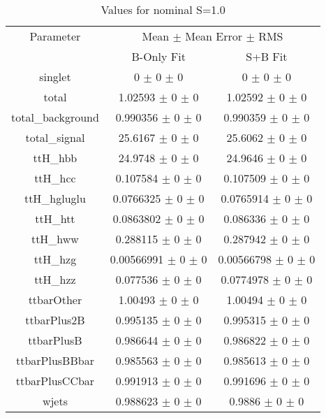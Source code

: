 \begin{table}
\centering
\caption{Values for nominal S=1.0}
\begin{tabular}{ccc}
\toprule
Parameter 	& \multicolumn{2}{c}{Mean $\pm$ Mean Error $\pm$ RMS}\\
 	& B-Only Fit & S+B Fit\\
\midrule
singlet 	& \num{0} $\pm$ \num{0} $\pm$ \num{0} 	& \num{0} $\pm$ \num{0} $\pm$ \num{0}\\
total 	& \num{1.02593} $\pm$ \num{0} $\pm$ \num{0} 	& \num{1.02592} $\pm$ \num{0} $\pm$ \num{0}\\
total\_background 	& \num{0.990356} $\pm$ \num{0} $\pm$ \num{0} 	& \num{0.990359} $\pm$ \num{0} $\pm$ \num{0}\\
total\_signal 	& \num{25.6167} $\pm$ \num{0} $\pm$ \num{0} 	& \num{25.6062} $\pm$ \num{0} $\pm$ \num{0}\\
ttH\_hbb 	& \num{24.9748} $\pm$ \num{0} $\pm$ \num{0} 	& \num{24.9646} $\pm$ \num{0} $\pm$ \num{0}\\
ttH\_hcc 	& \num{0.107584} $\pm$ \num{0} $\pm$ \num{0} 	& \num{0.107509} $\pm$ \num{0} $\pm$ \num{0}\\
ttH\_hgluglu 	& \num{0.0766325} $\pm$ \num{0} $\pm$ \num{0} 	& \num{0.0765914} $\pm$ \num{0} $\pm$ \num{0}\\
ttH\_htt 	& \num{0.0863802} $\pm$ \num{0} $\pm$ \num{0} 	& \num{0.086336} $\pm$ \num{0} $\pm$ \num{0}\\
ttH\_hww 	& \num{0.288115} $\pm$ \num{0} $\pm$ \num{0} 	& \num{0.287942} $\pm$ \num{0} $\pm$ \num{0}\\
ttH\_hzg 	& \num{0.00566991} $\pm$ \num{0} $\pm$ \num{0} 	& \num{0.00566798} $\pm$ \num{0} $\pm$ \num{0}\\
ttH\_hzz 	& \num{0.077536} $\pm$ \num{0} $\pm$ \num{0} 	& \num{0.0774978} $\pm$ \num{0} $\pm$ \num{0}\\
ttbarOther 	& \num{1.00493} $\pm$ \num{0} $\pm$ \num{0} 	& \num{1.00494} $\pm$ \num{0} $\pm$ \num{0}\\
ttbarPlus2B 	& \num{0.995135} $\pm$ \num{0} $\pm$ \num{0} 	& \num{0.995315} $\pm$ \num{0} $\pm$ \num{0}\\
ttbarPlusB 	& \num{0.986644} $\pm$ \num{0} $\pm$ \num{0} 	& \num{0.986822} $\pm$ \num{0} $\pm$ \num{0}\\
ttbarPlusBBbar 	& \num{0.985563} $\pm$ \num{0} $\pm$ \num{0} 	& \num{0.985613} $\pm$ \num{0} $\pm$ \num{0}\\
ttbarPlusCCbar 	& \num{0.991913} $\pm$ \num{0} $\pm$ \num{0} 	& \num{0.991696} $\pm$ \num{0} $\pm$ \num{0}\\
wjets 	& \num{0.988623} $\pm$ \num{0} $\pm$ \num{0} 	& \num{0.9886} $\pm$ \num{0} $\pm$ \num{0}\\
\bottomrule
\end{tabular}
\end{table}